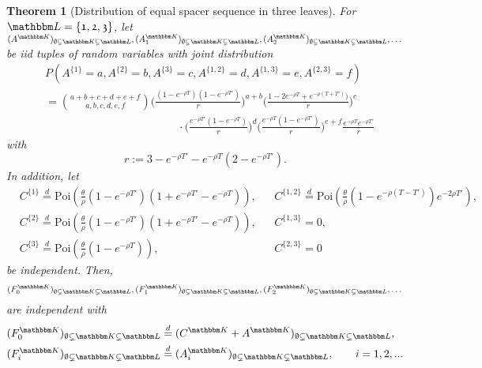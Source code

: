 \documentclass[preprint,authoryear]{elsarticle}
\newtheorem{theorem}{Theorem}
\theoremstyle{definition}
\numberwithin{equation}{section}
\numberwithin{figure}{section}
\begin{document}
\begin{theorem}[Distribution of equal spacer sequence in three leaves\label{T:2}]
  For $\mathbbm L = \{\mathfrak 1, \mathfrak 2, \mathfrak 3\}$, let
  $(A^{\mathbbm K})_{\emptyset\subsetneq \mathbbm K \subsetneq
    \mathbbm L}, (A_1^{\mathbbm K})_{\emptyset\subsetneq \mathbbm K
    \subsetneq \mathbbm L}, (A_2^{\mathbbm K})_{\emptyset\subsetneq
    \mathbbm K \subsetneq \mathbbm L},\dots$
  be iid tuples of random variables with joint distribution
  \begin{equation}
    \label{eq:ABCDEF}
    \begin{aligned}
      &P(A^{\{\mathfrak1\}} = a, A^{\{\mathfrak2\}} = b,
      A^{\{\mathfrak3\}} = c,
      A^{\{\mathfrak1,\mathfrak2\}} = d, A^{\{\mathfrak1,\mathfrak3\}} = e, A^{\{\mathfrak2,\mathfrak3\}} = f)\\
      &= \binom{a+b+c+d+e+f}{a,b,c,d,e,f} \Big(\frac{(1-e^{-\rho
          T})(1-e^{-\rho T'})}{r}\Big)^{a+b}
      \Big(\frac{1-2e^{-\rho T} + e^{-\rho 
          (T+T')})}{r}\Big)^{c} \\ & \qquad\qquad \qquad\qquad
      \qquad\qquad \cdot \Big(\frac{e^{-\rho T'}(1-
        e^{-\rho T})}{r}\Big)^{d} \Big(\frac{e^{-\rho 
          T}(1- e^{-\rho T'})}{r}\Big)^{e+f}
      \frac{e^{-\rho T}e^{-\rho T'}}{r}
    \end{aligned}
  \end{equation}
  with 
  $$ r := 3 - e^{-\rho T'} - e^{-\rho T}(2-e^{-\rho T'}).$$ 
  In addition, let
    \begin{align*}
      &C^{\{\mathfrak 1\}} \stackrel d = \text{Poi}\left(\frac{\theta}{\rho}(1-e^{-\rho T'})
        (1+e^{-\rho T'}-e^{-\rho T})\right),
      &&  C^{\{\mathfrak 1, \mathfrak 2\}} \stackrel d = \text{Poi}\left(\frac{\theta}{\rho}
         (1-e^{- \rho (T-T')}) e^{-2\rho T'}\right),
      \\  &C^{\{\mathfrak 2\}} \stackrel d = \text{Poi}\left(\frac{\theta}{\rho}(1-e^{-\rho T'})
         (1+e^{-\rho T'}-e^{-\rho T})\right),      
      &&  C^{\{\mathfrak 1, \mathfrak 3\}} = 0,
      \\ & C^{\{\mathfrak 3\}} \stackrel d = \text{Poi}\left(\frac{\theta}{\rho}
            (1-e^{-\rho T})\right),      
      &&  C^{\{\mathfrak 2, \mathfrak 3\}} = 0
   \end{align*}
  be independent. Then,
  $$ (F_0^{\mathbbm K})_{\emptyset \subsetneq \mathbbm K\subsetneq \mathbbm L}, 
  (F_1^{\mathbbm K})_{\emptyset \subsetneq \mathbbm K\subsetneq
    \mathbbm L}, (F_2^{\mathbbm K})_{\emptyset \subsetneq \mathbbm
    K\subsetneq \mathbbm L},\dots$$ are independent with
  \begin{align*}
    (F_0^{\mathbbm K})_{\emptyset \subsetneq \mathbbm K\subsetneq \mathbbm L} 
    & \stackrel d = (C^{\mathbbm K} + A^{\mathbbm K})_{\emptyset \subsetneq \mathbbm K\subsetneq \mathbbm L},
    \\ 
    (F_i^{\mathbbm K})_{\emptyset \subsetneq \mathbbm K\subsetneq \mathbbm L} 
    & \stackrel d = (A_i^{\mathbbm K})_{\emptyset \subsetneq \mathbbm K\subsetneq \mathbbm L}, \qquad i=1,2,...
  \end{align*}
\end{theorem}
\end{document}
